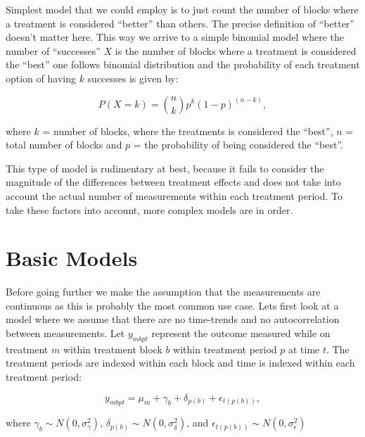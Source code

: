 \documentclass[12pt,a4paper,leqno]{report}
\theoremstyle{plain}
\theoremstyle{definition}
\theoremstyle{remark}
\begin{document}
Simplest model that we could employ is to just count the number of blocks where a
treatment is considered ``better'' than others. The precise definition of ``better''
doesn't matter here. This way we arrive to a simple binomial model where the number of
``successes'' \(X\) is the number of blocks where a treatment is considered the ``best''
one follows binomial distribution and the probability of each treatment option of having
\(k\) successes is given by:

\begin{def}\label{}
    \begin{equation}
        P(X = k) = {n\choose k}p^k{(1-p)}^{(n-k)},
    \end{equation}
\end{def}where \(k\) = number of blocks, where the treatments is considered the ``best'',
\(n\) = total number of blocks and \(p\) = the probability of being considered the
``best''.

This type of model is rudimentary at best, because it fails to consider the magnitude of
the differences between treatment effects and does not take into account the actual
number of measurements within each treatment period. To take these factors into account,
more complex models are in order.

\section{Basic Models}\label{conti}

Before going further we make the assumption that the measurements are continuous as this
is probably the most common use case. Lets first look at a model where we assume that
there are no time-trends and no autocorrelation between measurements. Let \(y_{mbpt}\)
represent the outcome measured while on treatment \(m\) within treatment block \(b\)
within treatment period \(p\) at time \(t\). The treatment periods are indexed within
each block and time is indexed within each treatment period:

\begin{def}\label{}
    \begin{equation}\label{allerrors}
        y_{mbpt} = \mu_m + \gamma_b + \delta_{p(b)} + \epsilon_{t(p(b))},
    \end{equation}
\end{def}where \(\gamma_b \sim N(0,\sigma^2_{\gamma})\), \(\delta_{p(b)} \sim
N(0,\sigma^2_{\delta})\), and \(\epsilon_{t(p(b))} \sim N(0,\sigma^2_{\epsilon})\)
\end{document}
